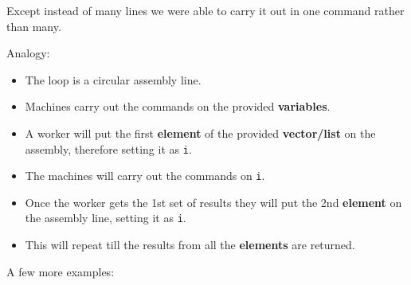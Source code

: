 \documentclass[]{book}
\providecommand{\tightlist}{%
  \setlength{\itemsep}{0pt}\setlength{\parskip}{0pt}}
\begin{document}
Except instead of many lines we were able to carry it out in one command
rather than many.

Analogy:

\begin{itemize}
\tightlist
\item
  The loop is a circular assembly line.
\item
  Machines carry out the commands on the provided \textbf{variables}.
\item
  A worker will put the first \textbf{element} of the provided
  \textbf{vector/list} on the assembly, therefore setting it as
  \texttt{i}.
\item
  The machines will carry out the commands on \texttt{i}.
\item
  Once the worker gets the 1st set of results they will put the 2nd
  \textbf{element} on the assembly line, setting it as \texttt{i}.
\item
  This will repeat till the results from all the \textbf{elements} are
  returned.
\end{itemize}

A few more examples:
\end{document}
